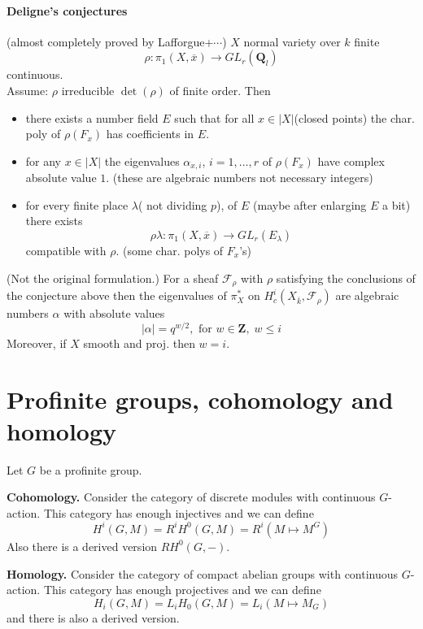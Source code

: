 \paragraph{Deligne's conjectures}(almost completely proved by
Lafforgue+$\cdots$) $X$ normal variety over $k$ finite
$$\rho: \pi_1(X, \overline x)\to GL_r(\mathbf{Q}_l) $$
continuous.\\
Assume: $\rho$ irreducible $\det(\rho)$ of finite order. Then
\begin{itemize}
\item there exists a number field $E$ such that for all $x\in
|X|$(closed points) the char. poly of $\rho(F_x)$ has coefficients in $E$.
\item for any $x\in |X|$ the eigenvalues $\alpha_{x, i}$, $i=1, \ldots,
r$ of $\rho(F_x)$ have complex absolute value $1$.
(these are algebraic numbers not necessary integers)
\item for every finite place $\lambda$( not dividing $p$), of $E$
(maybe after enlarging $E$ a bit) there exists
$$\rho\lambda: \pi_1(X, \overline x) \to GL_r(E_\lambda)$$
compatible with $\rho$. (some char. polys of $F_x$'s)
\end{itemize}

\begin{theorem} (Not the original formulation.) For a sheaf
$\mathcal{F}_\rho$ with $\rho$ satisfying the conclusions of the conjecture
above then the eigenvalues of $\pi_X^*$ on $H_c^i(X_{\overline k},
\mathcal{F}_{\rho})$ are algebraic numbers $\alpha$ with absolute values
$$|\alpha|=q^{w/2}, \text{ for }w\in \mathbf{Z}, \; w\leq i$$
Moreover, if $X$ smooth and proj. then $w=i$.
\end{theorem}


\section{Profinite groups, cohomology and homology}
\label{section-profinite-cohomology}

\noindent
Let $G$ be a profinite group.

\medskip\noindent
{\bf Cohomology.}
Consider the category of discrete modules with continuous $G$-action.
This category has enough injectives and we can define
$$
H^i(G, M) = R^iH^0(G, M) = R^i(M\mapsto M^G)
$$
Also there is a derived version $RH^0(G, -)$.

\medskip\noindent
{\bf Homology.}
Consider the category of compact abelian groups with continuous $G$-action.
This category has enough projectives and we can define
$$
H_i(G, M) = L_iH_0(G, M)=L_i(M\mapsto M_G)
$$
and there is also a derived version.

